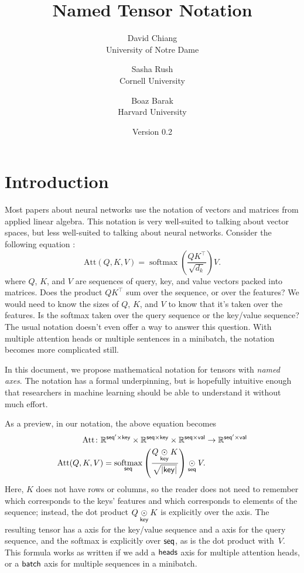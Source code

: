\documentclass{article}
\title{\bf Named Tensor Notation}
\author{David Chiang \\ \small University of Notre Dame \and Sasha Rush \\ \small Cornell University \and Boaz Barak \\ \small Harvard University}
\date{Version 0.2}
\DeclareMathOperator*{\softmax}{softmax}
\begin{document}
\maketitle

\setcounter{tocdepth}{2}
\tableofcontents

\clearpage

\section{Introduction}
\label{sec:intro}

Most papers about neural networks use the notation of vectors and matrices from applied linear algebra. This notation is very well-suited to talking about vector spaces, but less well-suited to talking about neural networks. Consider the following equation \citep{vaswani+:2017}:
\[ \text{Att}(Q, K, V) = \softmax \left( \frac{QK^\top}{\sqrt{d_k}} \right) V. \]
where $Q$, $K$, and $V$ are sequences of query, key, and value vectors packed into matrices. Does the product $QK^\top$ sum over the sequence, or over the features? We would need to know the sizes of $Q$, $K$, and $V$ to know that it's taken over the features. Is the softmax taken over the query sequence or the key/value sequence? The usual notation doesn't even offer a way to answer this question. With multiple attention heads or multiple sentences in a minibatch, the notation becomes more complicated still.

In this document, we propose mathematical notation for tensors with \emph{named axes}. The notation has a formal underpinning, but is hopefully intuitive enough that researchers in machine learning should be able to understand it without much effort.

As a preview, in our notation, the above equation becomes
\begin{align*}
  \text{Att} \colon \mathbb{R}^{\mathsf{seq'} \times \mathsf{key}} \times \mathbb{R}^{\mathsf{seq} \times\mathsf{key}} \times \mathbb{R}^{\mathsf{seq} \times\mathsf{val}} &\rightarrow \mathbb{R}^{\mathsf{seq'} \times \mathsf{val}} \\
  \text{Att}(Q,K,V) = \mathop{\underset{\mathsf{seq}}{\mathrm{softmax}}} \left( \frac{Q \mathbin{\underset{\mathsf{key}}{\odot}} K}{\sqrt{|\mathsf{key}|}} \right) \mathbin{\underset{\mathsf{seq}}{\odot}} V.
\end{align*}
Here, $K$ does not have rows or columns, so the reader does not need to remember which corresponds to the keys' features and which corresponds to elements of the sequence; instead, the dot product $Q \mathbin{\underset{\mathsf{key}}{\odot}} K$ is explicitly over the  axis. The resulting tensor has a  axis for the key/value sequence and a  axis for the query sequence, and the softmax is explicitly over $\mathsf{seq}$, as is the dot product with~$V$.
This formula works as written if we add a $\mathsf{heads}$ axis for multiple attention heads, or a $\mathsf{batch}$ axis for multiple sequences in a minibatch.
\end{document}
